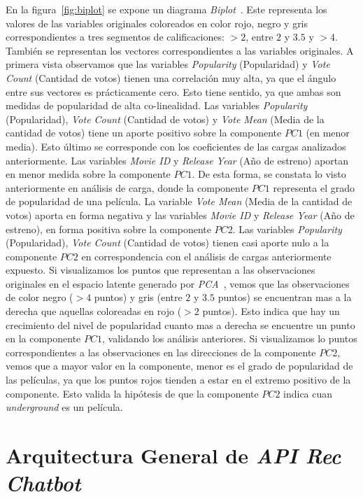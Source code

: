 \documentclass[11pt,a4paper,twoside]{thesis}
\begin{document}
En la figura~\ref{fig:biplot} se expone un diagrama
\textit{Biplot}~\cite{biplot}. Este representa los valores de las variables
originales coloreados en color rojo, negro y gris correspondientes a tres
segmentos de calificaciones: $>2$, entre $2$ y $3.5$ y $>4$. También se
representan los vectores correspondientes a las variables originales. A primera
vista observamos que las variables \textit{Popularity} (Popularidad) y
\textit{Vote Count} (Cantidad de votos) tienen una correlación muy alta, ya que
el ángulo entre sus vectores es prácticamente cero. Esto tiene sentido, ya que
ambas son medidas de popularidad de alta co-linealidad. Las variables
\textit{Popularity} (Popularidad), \textit{Vote Count} (Cantidad de votos) y
\textit{Vote Mean} (Media de la cantidad de votos) tiene un aporte positivo
sobre la componente $PC1$ (en menor media). Esto último se corresponde con los
coeficientes de las cargas analizados anteriormente. Las variables
\textit{Movie ID} y \textit{Release Year} (Año de estreno) aportan en menor
medida sobre la componente $PC1$. De esta forma, se constata lo visto
anteriormente en análisis de carga, donde la componente $PC1$ representa el
grado de popularidad de una película. La variable \textit{Vote Mean} (Media de
la cantidad de votos) aporta en forma negativa y las variables \textit{Movie ID
} y \textit{Release Year} (Año de estreno), en forma positiva sobre la
componente $PC2$. Las variables \textit{Popularity} (Popularidad), \textit{Vote
	Count} (Cantidad de votos) tienen casi aporte nulo a la componente $PC2$ en
correspondencia con el análisis de cargas anteriormente expuesto. Si
visualizamos los puntos que representan a las observaciones originales en el
espacio latente generado por \textit{PCA}~\cite{pca}, vemos que las
observaciones de color negro ($>4$ puntos) y gris (entre $2$ y $3.5$ puntos) se
encuentran mas a la derecha que aquellas coloreadas en rojo ($>2$ puntos). Esto
indica que hay un crecimiento del nivel de popularidad cuanto mas a derecha se
encuentre un punto en la componente $PC1$, validando los análisis anteriores.
Si visualizamos lo puntos correspondientes a las observaciones en las
direcciones de la componente $PC2$, vemos que a mayor valor en la componente,
menor es el grado de popularidad de las películas, ya que los puntos rojos
tienden a estar en el extremo positivo de la componente. Esto valida la
hipótesis de que la componente $PC2$ indica cuan \textit{underground} es un
película.


\chapter{Arquitectura General de \textit{API Rec Chatbot}}
\label{sec:arq-general}
\end{document}
